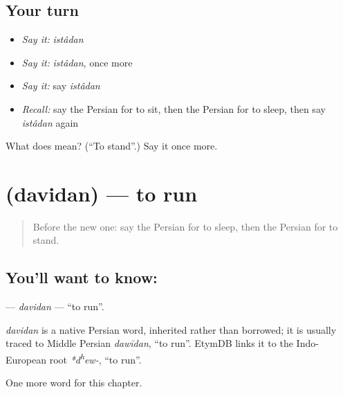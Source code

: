 \subsection*{Your turn}
\begin{itemize}
\raggedright
  \item \emph{Say it:} \emph{istâdan}
  \item \emph{Say it:} \emph{istâdan}, once more
  \item \emph{Say it:} say \emph{istâdan}
  \item \emph{Recall:} say the Persian for to sit, then the Persian for to sleep, then say \emph{istâdan} again
\end{itemize}

\begin{tcolorbox}[breakable,colback=teal!4,colframe=teal!35!black,title={Before you move on}]
What does  mean? (\textquotedblleft{}To stand\textquotedblright{}.) Say it once more.
\end{tcolorbox}
\section[\texorpdfstring{\fa{دویدن} (davidan)}{دویدن (davidan)}]{ (davidan) — to run}

\label{lesson:FA-C36-davidan}



\begin{quote}
Before the new one: say the Persian for to sleep, then the Persian for to stand.
\end{quote}

\subsection*{You'll want to know: }
\textbf{} — \emph{davidan} — \textquotedblleft{}to run\textquotedblright{}.

\begin{cousinweb}
\emph{davidan} is a native Persian word, inherited rather than borrowed; it is usually traced to Middle Persian \emph{dawīdan}, \textquotedblleft{}to run\textquotedblright{}. EtymDB links it to the Indo-European root \emph{*d\textsuperscript{h}ew-}, \textquotedblleft{}to run\textquotedblright{}.
\end{cousinweb}

\begin{grammarlens}[title={What you've built}]
One more word for this chapter.
\end{grammarlens}

